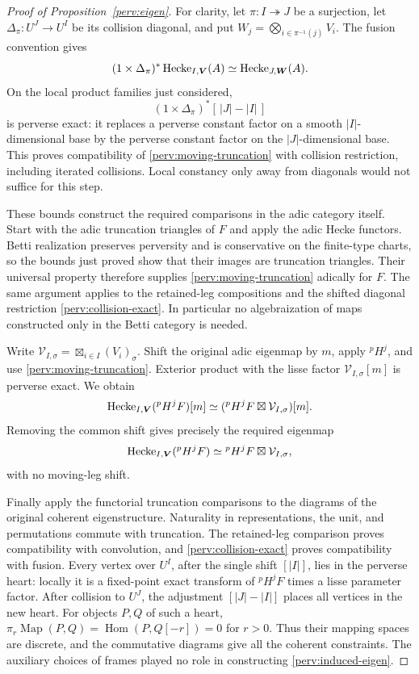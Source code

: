 \begin{proof}[Proof of Proposition~\ref{perv:eigen}]
For clarity, let $\pi:I\twoheadrightarrow J$ be a surjection, let
$\Delta_\pi:U^J\to U^I$ be its collision diagonal, and put
$W_j=\bigotimes_{i\in\pi^{-1}(j)}V_i$.  The fusion convention gives
\[
 (1\times\Delta_\pi)^*\operatorname{Hecke}_{I,\boldsymbol V}(A)
                  \simeq\operatorname{Hecke}_{J,\boldsymbol W}(A).
\]
On the local product families just considered,
\begin{equation}\label{perv:collision-exact}
                  (1\times\Delta_\pi)^*[\,|J|-|I|\,]
\end{equation}
is perverse exact: it replaces a perverse constant factor on a smooth
$|I|$-dimensional base by the perverse constant factor on the
$|J|$-dimensional base.  This proves compatibility of
\eqref{perv:moving-truncation} with collision restriction, including
iterated collisions.  Local constancy only away from diagonals would
not suffice for this step.

These bounds construct the required comparisons in the adic category
itself.  Start with the adic truncation triangles of $F$ and apply the
adic Hecke functors.  Betti realization preserves perversity and is
conservative on the finite-type charts, so the bounds just proved show
that their images are truncation triangles.  Their universal property
therefore supplies \eqref{perv:moving-truncation} adically for $F$.
The same argument applies to the retained-leg compositions and the
shifted diagonal restriction \eqref{perv:collision-exact}.
In particular no algebraization of maps constructed only in the Betti
category is needed.

Write $\mathcal V_{I,\sigma}=\boxtimes_{i\in I}(V_i)_\sigma$.
Shift the original adic eigenmap by $m$, apply ${}^pH^j$, and use
\eqref{perv:moving-truncation}.  Exterior product with the lisse factor
$\mathcal V_{I,\sigma}[m]$ is perverse exact.  We obtain
\[
 \operatorname{Hecke}_{I,\boldsymbol V}({}^pH^jF)[m]
       \simeq({}^pH^jF\boxtimes\mathcal V_{I,\sigma})[m].
\]
Removing the common shift gives precisely the required eigenmap
\begin{equation}\label{perv:induced-eigen}
 \operatorname{Hecke}_{I,\boldsymbol V}({}^pH^jF)
                  \simeq{}^pH^jF\boxtimes\mathcal V_{I,\sigma},
\end{equation}
with no moving-leg shift.

Finally apply the functorial truncation comparisons to the diagrams of
the original coherent eigenstructure.  Naturality in representations,
the unit, and permutations commute with truncation.  The retained-leg
comparison proves compatibility with convolution, and
\eqref{perv:collision-exact} proves compatibility with fusion.
Every vertex over $U^I$, after the single shift $[|I|]$, lies in the
perverse heart: locally it is a fixed-point exact transform of
${}^pH^jF$ times a lisse parameter factor.  After collision to $U^J$,
the adjustment $[|J|-|I|]$ places all vertices in the new heart.
For objects $P,Q$ of such a heart,
$\pi_r\operatorname{Map}(P,Q)=\operatorname{Hom}(P,Q[-r])=0$ for
$r>0$.  Thus their mapping spaces are discrete, and the commutative
diagrams give all the coherent constraints.  The auxiliary choices of
frames played no role in constructing \eqref{perv:induced-eigen}.


\end{proof}
